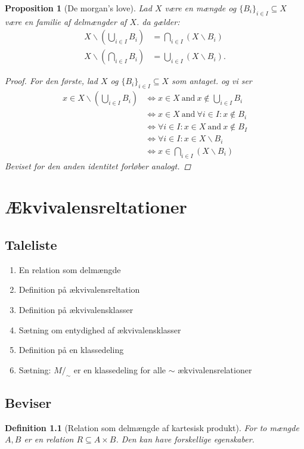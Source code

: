 \documentclass[10pt,twoside,openany,final]{memoir}
\theoremstyle{break}
\newtheorem{proposition}[section]{Proposition}
\newtheorem{definition}[section]{Definition}
\theoremstyle{Break}
\begin{document}
\begin{proposition}[De morgan's love]
Lad $X$ være en mængde og $\{ B_{i}\}_{i \in I} \subseteq X$ være en familie af delmængder af $X$. da gælder:
\begin{align*}
X \backslash \left( \bigcup_{i \in I} B_{i} \right) &= \bigcap_{i \in I} (X \backslash B_{i})\\
X \backslash \left( \bigcap_{i \in I} B_{i} \right) &= \bigcup_{i \in I} (X \backslash B_{i}).
\end{align*}
\begin{proof}
For den første, lad $X$ og $\{ B_{i}\}_{i \in I} \subseteq X$ som antaget. og vi ser
\begin{align*}
x \in X \backslash \left( \bigcup_{i \in I} B_{i} \right) &\iff x \in X \ \text{and} \ x \not\in \bigcup_{i \in I} B_{i}\\
& \iff x \in X \ \text{and} \ \forall i \in I \colon x \not\in B_{i} \\
&\iff \forall i \in I \colon x \in X \ \text{and} \ x \not\in B_{I}\\
&\iff \forall i \in I \colon x \in X \backslash B_{i} \\
&\iff x\in \bigcap_{i \in I} (X \backslash B_{i})
\end{align*}
Beviset for den anden identitet forløber analogt.
\end{proof}
\end{proposition}

\chapter{Ækvivalensreltationer}
\section*{Taleliste}
\begin{enumerate}
\item En relation som delmængde
\item Definition på ækvivalensreltation
\item Definition på ækvivalensklasser
\item Sætning om entydighed af ækvivalensklasser
\item Definition på en klassedeling
\item Sætning: $M /_{\sim}$ er en klassedeling for alle $\sim$ ækvivalensrelationer
\end{enumerate}
\section*{Beviser}
\begin{definition}[Relation som delmængde af kartesisk produkt]
For to mængde $A,B$ er en relation $R \subseteq A \times B$. Den kan have forskellige egenskaber.
\end{definition}
\end{document}
